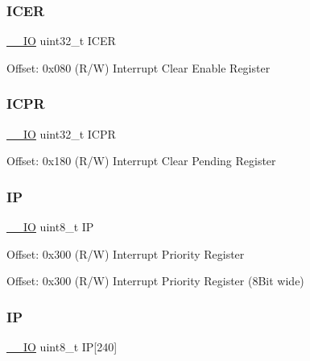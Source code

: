 \subsubsection{\texorpdfstring{ICER}{ICER}}
{\footnotesize\ttfamily \mbox{\hyperlink{core__sc300_8h_aec43007d9998a0a0e01faede4133d6be}{\+\_\+\+\_\+\+IO}} uint32\+\_\+t I\+C\+ER}

Offset\+: 0x080 (R/W) Interrupt Clear Enable Register \mbox{\label{struct_n_v_i_c___type_a281c819da5f0f4265f5b88d269544bc9}} 
\subsubsection{\texorpdfstring{ICPR}{ICPR}}
{\footnotesize\ttfamily \mbox{\hyperlink{core__sc300_8h_aec43007d9998a0a0e01faede4133d6be}{\+\_\+\+\_\+\+IO}} uint32\+\_\+t I\+C\+PR}

Offset\+: 0x180 (R/W) Interrupt Clear Pending Register \mbox{\label{struct_n_v_i_c___type_a519d82311efa6ead6f53b495d3d80de8}} 
\subsubsection{\texorpdfstring{IP}{IP}\hspace{0.1cm}{\footnotesize\ttfamily [1/2]}}
{\footnotesize\ttfamily \mbox{\hyperlink{core__sc300_8h_aec43007d9998a0a0e01faede4133d6be}{\+\_\+\+\_\+\+IO}} uint8\+\_\+t IP}

Offset\+: 0x300 (R/W) Interrupt Priority Register

Offset\+: 0x300 (R/W) Interrupt Priority Register (8Bit wide) \mbox{\label{struct_n_v_i_c___type_a38c377984f751265667317981f101bb4}} 
\subsubsection{\texorpdfstring{IP}{IP}\hspace{0.1cm}{\footnotesize\ttfamily [2/2]}}
{\footnotesize\ttfamily \mbox{\hyperlink{core__sc300_8h_aec43007d9998a0a0e01faede4133d6be}{\+\_\+\+\_\+\+IO}} uint8\+\_\+t IP\mbox{[}240\mbox{]}}

